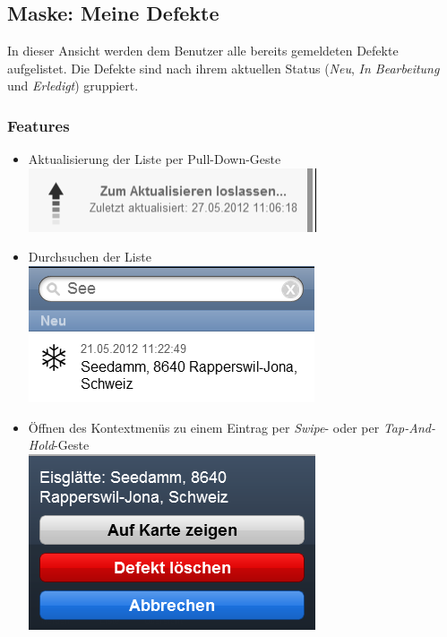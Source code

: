 \subsection{Maske: Meine Defekte}
In dieser Ansicht werden dem Benutzer alle bereits gemeldeten Defekte aufgelistet. Die Defekte sind nach ihrem aktuellen Status (\emph{Neu}, \emph{In Bearbeitung} und \emph{Erledigt}) gruppiert.

\subsubsection{Features}
\begin{itemize}
\item Aktualisierung der Liste per Pull-Down-Geste \\ \includegraphics[scale=0.8]{images/usecase2-fixmystreet/features/features-list-pull_down_refresh}
\item Durchsuchen der Liste \\ \includegraphics[scale=0.8]{images/usecase2-fixmystreet/features/features-list-search}
\item Öffnen des Kontextmenüs zu einem Eintrag per \emph{Swipe}- oder per \emph{Tap-And-Hold}-Geste \\ \includegraphics[scale=0.8]{images/usecase2-fixmystreet/features/features-list-contextmenu}
\end{itemize}

